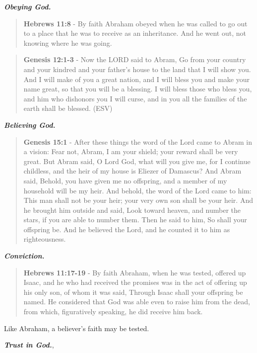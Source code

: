 \documentclass[11pt]{article}
\begin{document}
\emph{\textbf{Obeying God.}}

\begin{quote}
\textbf{Hebrews 11:8} - By faith Abraham obeyed when he was called to go out to a place that he was to receive as an inheritance. And he went out, not knowing where he was going.
\end{quote}

\begin{quote}
\textbf{Genesis 12:1-3} - Now the LORD said to Abram, Go from your country and your kindred and your father's house to the land that I will show you. And I will make of you a great nation, and I will bless you and make your name great, so that you will be a blessing. I will bless those who bless you, and him who dishonors you I will curse, and in you all the families of the earth shall be blessed. (ESV)
\end{quote}

\emph{\textbf{Believing God.}}

\begin{quote}
\textbf{Genesis 15:1} - After these things the word of the Lord came to Abram in a vision: Fear not, Abram, I am your shield; your reward shall be very great. But Abram said, O Lord God, what will you give me, for I continue childless, and the heir of my house is Eliezer of Damascus? And Abram said, Behold, you have given me no offspring, and a member of my household will be my heir. And behold, the word of the Lord came to him: This man shall not be your heir; your very own son shall be your heir. And he brought him outside and said, Look toward heaven, and number the stars, if you are able to number them. Then he said to him, So shall your offspring be. And he believed the Lord, and he counted it to him as righteousness.
\end{quote}

\emph{\textbf{Conviction.}}

\begin{quote}
\textbf{Hebrews 11:17-19} - By faith Abraham, when he was tested, offered up Isaac, and he who had received the promises was in the act of offering up his only son, of whom it was said, Through Isaac shall your offspring be named. He considered that God was able even to raise him from the dead, from which, figuratively speaking, he did receive him back.
\end{quote}

Like Abraham, a believer's faith may be tested.

\emph{\textbf{Trust in God.}},
\end{document}
